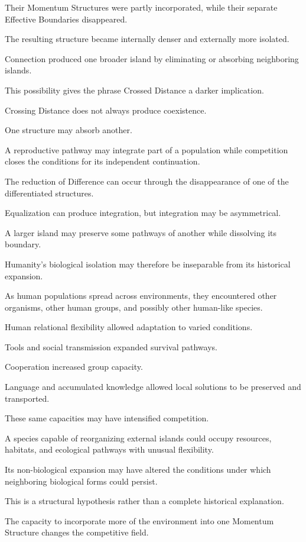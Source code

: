 Their Momentum Structures were partly incorporated, while their separate Effective Boundaries disappeared.

The resulting structure became internally denser and externally more isolated.

Connection produced one broader island by eliminating or absorbing neighboring islands.

This possibility gives the phrase Crossed Distance a darker implication.

Crossing Distance does not always produce coexistence.

One structure may absorb another.

A reproductive pathway may integrate part of a population while competition closes the conditions for its independent continuation.

The reduction of Difference can occur through the disappearance of one of the differentiated structures.

Equalization can produce integration, but integration may be asymmetrical.

A larger island may preserve some pathways of another while dissolving its boundary.

Humanity’s biological isolation may therefore be inseparable from its historical expansion.

As human populations spread across environments, they encountered other organisms, other human groups, and possibly other human-like species.

Human relational flexibility allowed adaptation to varied conditions.

Tools and social transmission expanded survival pathways.

Cooperation increased group capacity.

Language and accumulated knowledge allowed local solutions to be preserved and transported.

These same capacities may have intensified competition.

A species capable of reorganizing external islands could occupy resources, habitats, and ecological pathways with unusual flexibility.

Its non-biological expansion may have altered the conditions under which neighboring biological forms could persist.

This is a structural hypothesis rather than a complete historical explanation.

The capacity to incorporate more of the environment into one Momentum Structure changes the competitive field.

